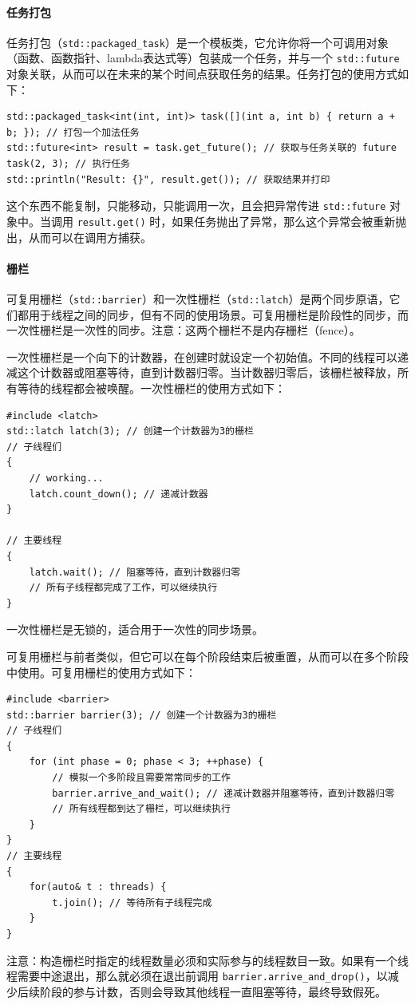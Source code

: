 \paragraph{任务打包} 任务打包（\verb|std::packaged_task|）是一个模板类，它允许你将一个可调用对象（函数、函数指针、lambda表达式等）包装成一个任务，并与一个 \verb|std::future| 对象关联，从而可以在未来的某个时间点获取任务的结果。任务打包的使用方式如下：
\begin{verbatim}
std::packaged_task<int(int, int)> task([](int a, int b) { return a + b; }); // 打包一个加法任务
std::future<int> result = task.get_future(); // 获取与任务关联的 future
task(2, 3); // 执行任务
std::println("Result: {}", result.get()); // 获取结果并打印
\end{verbatim}
这个东西不能复制，只能移动，只能调用一次，且会把异常传进 \verb|std::future| 对象中。当调用 \verb|result.get()| 时，如果任务抛出了异常，那么这个异常会被重新抛出，从而可以在调用方捕获。

\paragraph{栅栏} 可复用栅栏（\verb|std::barrier|）和一次性栅栏（\verb|std::latch|）是两个同步原语，它们都用于线程之间的同步，但有不同的使用场景。可复用栅栏是阶段性的同步，而一次性栅栏是一次性的同步。注意：这两个栅栏不是内存栅栏（fence）。

一次性栅栏是一个向下的计数器，在创建时就设定一个初始值。不同的线程可以递减这个计数器或阻塞等待，直到计数器归零。当计数器归零后，该栅栏被释放，所有等待的线程都会被唤醒。一次性栅栏的使用方式如下：
\begin{verbatim}
#include <latch>
std::latch latch(3); // 创建一个计数器为3的栅栏
// 子线程们
{
    // working...
    latch.count_down(); // 递减计数器
}

// 主要线程
{
    latch.wait(); // 阻塞等待，直到计数器归零
    // 所有子线程都完成了工作，可以继续执行
}
\end{verbatim}
一次性栅栏是无锁的，适合用于一次性的同步场景。

可复用栅栏与前者类似，但它可以在每个阶段结束后被重置，从而可以在多个阶段中使用。可复用栅栏的使用方式如下：
\begin{verbatim}
#include <barrier>
std::barrier barrier(3); // 创建一个计数器为3的栅栏
// 子线程们
{
    for (int phase = 0; phase < 3; ++phase) {
        // 模拟一个多阶段且需要常常同步的工作
        barrier.arrive_and_wait(); // 递减计数器并阻塞等待，直到计数器归零
        // 所有线程都到达了栅栏，可以继续执行
    }
}
// 主要线程
{
    for(auto& t : threads) {
        t.join(); // 等待所有子线程完成
    }
}
\end{verbatim}
注意：构造栅栏时指定的线程数量必须和实际参与的线程数目一致。如果有一个线程需要中途退出，那么就必须在退出前调用 \verb|barrier.arrive_and_drop()|，以减少后续阶段的参与计数，否则会导致其他线程一直阻塞等待，最终导致假死。


